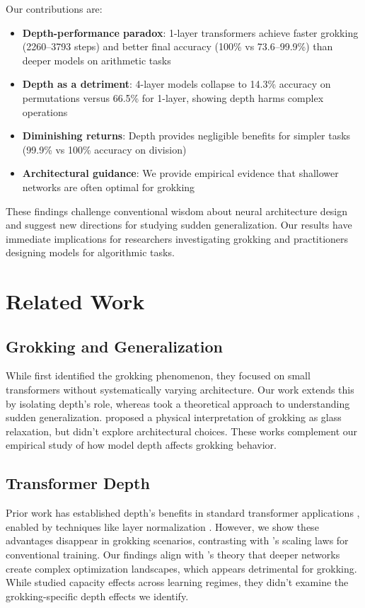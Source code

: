 \documentclass{article} %
\begin{document}
Our contributions are:
\begin{itemize}
    \item \textbf{Depth-performance paradox}: 1-layer transformers achieve faster grokking (2260--3793 steps) and better final accuracy (100\% vs 73.6--99.9\%) than deeper models on arithmetic tasks
    \item \textbf{Depth as a detriment}: 4-layer models collapse to 14.3\% accuracy on permutations versus 66.5\% for 1-layer, showing depth harms complex operations
    \item \textbf{Diminishing returns}: Depth provides negligible benefits for simpler tasks (99.9\% vs 100\% accuracy on division)
    \item \textbf{Architectural guidance}: We provide empirical evidence that shallower networks are often optimal for grokking
\end{itemize}

These findings challenge conventional wisdom about neural architecture design \citep{goodfellow2016deep} and suggest new directions for studying sudden generalization. Our results have immediate implications for researchers investigating grokking and practitioners designing models for algorithmic tasks.

\section{Related Work}
\label{sec:related}

\subsection{Grokking and Generalization}
While \citet{power2022grokking} first identified the grokking phenomenon, they focused on small transformers without systematically varying architecture. Our work extends this by isolating depth's role, whereas \citet{Liu2022TowardsUG} took a theoretical approach to understanding sudden generalization. \citet{Zhang2025IsGA} proposed a physical interpretation of grokking as glass relaxation, but didn't explore architectural choices. These works complement our empirical study of how model depth affects grokking behavior.

\subsection{Transformer Depth}
Prior work has established depth's benefits in standard transformer applications \citep{vaswani2017attention,Tay2020EfficientTA}, enabled by techniques like layer normalization \citep{ba2016layer}. However, we show these advantages disappear in grokking scenarios, contrasting with \citet{Hestness2017DeepLS}'s scaling laws for conventional training. Our findings align with \citet{Kawaguchi2016DeepLW}'s theory that deeper networks create complex optimization landscapes, which appears detrimental for grokking. While \citet{Nakkiran2021TheDB} studied capacity effects across learning regimes, they didn't examine the grokking-specific depth effects we identify.
\end{document}
